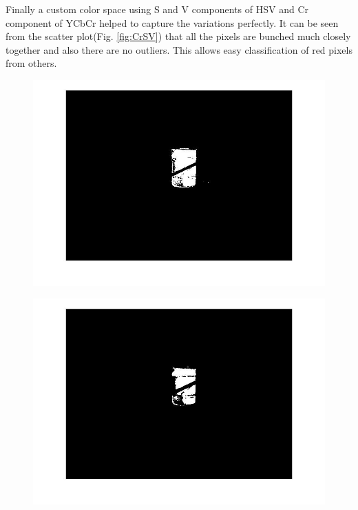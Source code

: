 \documentclass[fleqn,10pt]{SelfArx} %
\begin{document}
Finally a custom color space using S and V components of HSV and Cr component of YCbCr helped to capture the variations perfectly. It can be seen from the scatter plot(Fig. \ref{fig:CrSV})  that all the pixels are bunched much closely together and also there are no outliers. This allows easy classification of red pixels from others.

\begin{figure}[htb!]
\centering
\begin{minipage}[b]{.24\textwidth}
\includegraphics[trim={3cm 2cm 3cm 2cm},clip,scale=0.19]{mp1.jpg}
\label{label-a}
\end{minipage}
\begin{minipage}[b]{.24\textwidth}
\includegraphics[trim={3cm 2cm 3cm 2cm},clip,scale=0.19]{mp2.jpg}
\label{label-b}

\end{minipage}
\end{figure}
\end{document}

